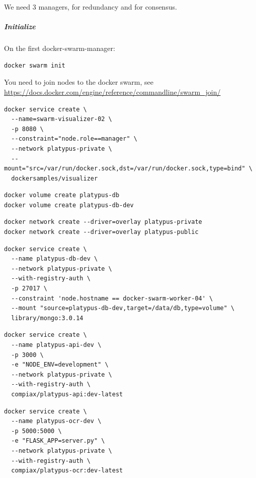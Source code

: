 \documentclass[12pt,a4paper]{article}
\begin{document}
We need 3 managers, for redundancy and for consensus.

\subparagraph{Initialize}
\subparagraph{}
On the first docker-swarm-manager:
\vspace{0.5cm}
\begin{lstlisting}
docker swarm init
\end{lstlisting}
 \vspace{0.5cm}
You need to join nodes to the docker swarm, see  \url{https://docs.docker.com/engine/reference/commandline/swarm_join/} 
\vspace{0.5cm}
\begin{lstlisting}
docker service create \
  --name=swarm-visualizer-02 \
  -p 8080 \
  --constraint="node.role==manager" \
  --network platypus-private \
  --mount="src=/var/run/docker.sock,dst=/var/run/docker.sock,type=bind" \
  dockersamples/visualizer
\end{lstlisting}
\vspace{0.5cm}
\begin{lstlisting}
docker volume create platypus-db
docker volume create platypus-db-dev
\end{lstlisting}
\vspace{0.5cm}
\begin{lstlisting}
docker network create --driver=overlay platypus-private
docker network create --driver=overlay platypus-public
\end{lstlisting}
\vspace{0.5cm}
\begin{lstlisting}
docker service create \
  --name platypus-db-dev \
  --network platypus-private \
  --with-registry-auth \
  -p 27017 \
  --constraint 'node.hostname == docker-swarm-worker-04' \
  --mount "source=platypus-db-dev,target=/data/db,type=volume" \
  library/mongo:3.0.14
\end{lstlisting}
\vspace{0.5cm}
\begin{lstlisting}
docker service create \
  --name platypus-api-dev \
  -p 3000 \
  -e "NODE_ENV=development" \
  --network platypus-private \
  --with-registry-auth \
  compiax/platypus-api:dev-latest
\end{lstlisting}
\vspace{0.5cm}
\begin{lstlisting}
docker service create \
  --name platypus-ocr-dev \
  -p 5000:5000 \
  -e "FLASK_APP=server.py" \
  --network platypus-private \
  --with-registry-auth \
  compiax/platypus-ocr:dev-latest
\end{lstlisting}
\end{document}
